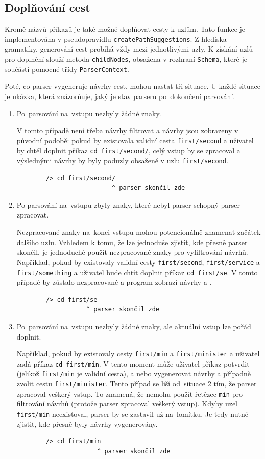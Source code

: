 \documentclass[thesis=B,czech,hidelinks]{FITthesis}[2019/03/06]
\begin{document}
\subsection{Doplňování cest}
Kromě názvů příkazů je také možné doplňovat cesty k uzlům. Tato funkce je implementována v pseudopravidlu \texttt{createPathSuggestions}. Z hlediska gramatiky, generování cest probíhá vždy mezi jednotlivými uzly. K získání uzlů pro doplnění slouží metoda \texttt{childNodes}, obsažena v rozhraní \texttt{Schema}, které je součástí pomocné třídy \texttt{ParserContext}.

Poté, co parser vygeneruje návrhy cest, mohou nastat tři situace. U každé situace je ukázka, která znázorňuje, jaký je stav parseru po~dokončení parsování.
\begin{enumerate}
    \item Po~parsování na~vstupu nezbyly žádné znaky.

        V tomto případě není třeba návrhy filtrovat a návrhy jsou zobrazeny v původní podobě: pokud by existovala validní cesta \texttt{first/second} a uživatel by chtěl doplnit příkaz \texttt{cd first/second/}, celý vstup by se zpracoval a výslednými návrhy by byly poduzly obsažené v uzlu \texttt{first/second}.
        \begin{verbatim}
        /> cd first/second/
                          ^ parser skončil zde
        \end{verbatim}
    \item Po parsování na~vstupu zbyly znaky, které nebyl parser schopný parser zpracovat.

        Nezpracované znaky na~konci vstupu mohou potencionálně znamenat začátek dalšího uzlu. Vzhledem k tomu, že lze jednoduše zjistit, kde přesně parser skončil, je jednoduché použít nezpracované znaky pro vyfiltrování návrhů. Například, pokud by existovaly validní cesty \texttt{first/second}, \texttt{first/service} a \texttt{first/something} a uživatel bude chtít doplnit příkaz \texttt{cd first/se}. V tomto případě by  zůstalo nezpracované a program zobrazí návrhy  a .
        \begin{verbatim}
        /> cd first/se
                   ^ parser skončil zde
        \end{verbatim}
    \item Po~parsování na~vstupu nezbyly žádné znaky, ale aktuální vstup lze pořád doplnit.

        Například, pokud by existovaly cesty \texttt{first/min} a \texttt{first/minister} a uživatel zadá příkaz \texttt{cd first/min}. V tento moment může uživatel příkaz potvrdit (jelikož \texttt{first/min} je validní cesta), a nebo vygenerovat návrhy a případně zvolit cestu \texttt{first/minister}. Tento případ se liší od~situace 2 tím, že parser zpracoval veškerý vstup. To znamená, že nemohu použít řetězec \texttt{min} pro filtrování návrhů (protože parser zpracoval veškerý vstup). Kdyby uzel \texttt{first/min} neexistoval, parser by se zastavil už na~lomítku. Je tedy nutné zjistit, kde přesně byly návrhy vygenerovány.
        \begin{verbatim}
        /> cd first/min
                      ^ parser skončil zde
        \end{verbatim}


\end{enumerate}
\end{document}
